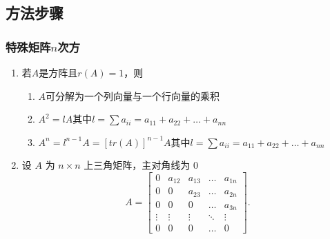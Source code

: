 \documentclass[./linear_algebra.tex]{subfiles}
\begin{document}
    \subsection{方法步骤}

    \subsubsection{特殊矩阵$n$次方}
    \begin{enumerate}
        \item 若$A$是方阵且$r(A) = 1$，则
        \begin{enumerate}
            \item $A$可分解为一个列向量与一个行向量的乘积
            \item $A^2 = lA$其中$l = \sum a_{ii} = a_{11} + a_{22} + \dots + a_{nn} $
            \item $A^n = l^{n-1}A = [tr(A)]^{n-1}A$其中$l = \sum a_{ii} = a_{11} + a_{22} + \dots + a_{nn} $
        \end{enumerate}
        \item 设 $A$ 为 $n \times n$ 上三角矩阵，主对角线为 0
        \[
            A =
            \begin{bmatrix}
                0      & a_{12} & a_{13} & \dots  & a_{1n} \\
                0      & 0      & a_{23} & \dots  & a_{2n} \\
                0      & 0      & 0      & \dots  & a_{3n} \\
                \vdots & \vdots & \vdots & \ddots & \vdots \\
                0      & 0      & 0      & \dots  & 0
            \end{bmatrix}.
        \]


\end{enumerate}
\end{document}
